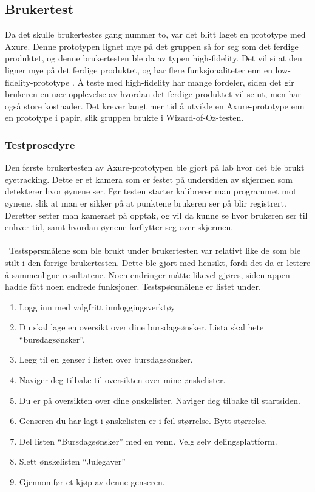 \subsection{Brukertest}
Da det skulle brukertestes gang nummer to, var det blitt laget en prototype med Axure. Denne prototypen lignet mye på det gruppen så for seg som det ferdige produktet, og denne brukertesten ble da av typen high-fidelity. Det vil si at den ligner mye på det ferdige produktet, og har flere funksjonaliteter enn en low-fidelity-prototype \cite[s.~391]{preece}. Å teste med high-fidelity har mange fordeler, siden det gir brukeren en nær opplevelse av hvordan det ferdige produktet vil se ut, men har også store kostnader. Det krever langt mer tid å utvikle en Axure-prototype enn en prototype i papir, slik gruppen brukte i Wizard-of-Oz-testen.

\subsubsection{Testprosedyre}
Den første brukertesten av Axure-prototypen ble gjort på lab hvor det ble brukt eyetracking. Dette er et kamera som er festet på undersiden av skjermen som detekterer hvor øynene ser. Før testen starter kalibrerer man programmet mot øynene, slik at man er sikker på at punktene brukeren ser på blir registrert. Deretter setter man kameraet på opptak, og vil da kunne se hvor brukeren ser til enhver tid, samt hvordan øynene forflytter seg over skjermen.
\\\\\
Testspørsmålene som ble brukt under brukertesten var relativt like de som ble stilt i den forrige brukertesten. Dette ble gjort med hensikt, fordi det da er lettere å sammenligne resultatene. Noen endringer måtte likevel gjøres, siden appen hadde fått noen endrede funksjoner. Testspørsmålene er listet under.

\begin{enumerate}
    \item Logg inn med valgfritt innloggingsverktøy
    \item Du skal lage en oversikt over dine bursdagsønsker. Lista skal hete “bursdagsønsker”.
    \item Legg til en genser i listen over bursdagsønsker.
    \item Naviger deg tilbake til oversikten over mine ønskelister.
    \item Du er på oversikten over dine ønskelister. Naviger deg tilbake til startsiden.
    \item Genseren du har lagt i ønskelisten er i feil størrelse. Bytt størrelse.
    \item Del listen “Bursdagsønsker” med en venn. Velg selv delingsplattform.
    \item Slett ønskelisten “Julegaver”
    \item Gjennomfør et kjøp av denne genseren.
\end{enumerate}

